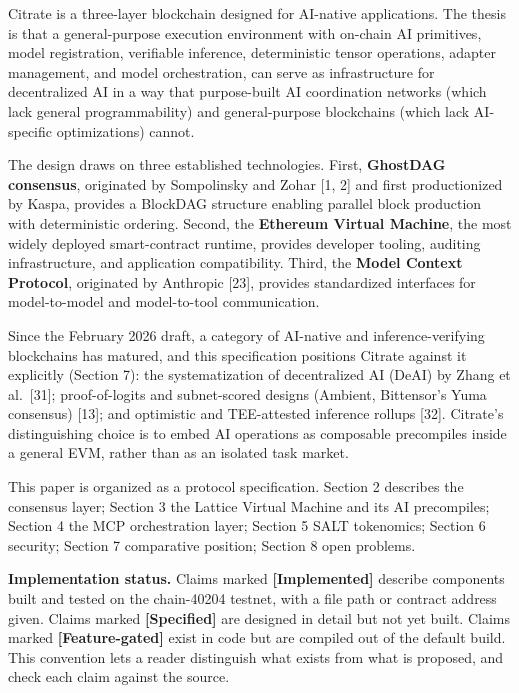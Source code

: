 Citrate is a three-layer blockchain designed for AI-native applications.
The thesis is that a general-purpose execution environment with on-chain
AI primitives, model registration, verifiable inference, deterministic
tensor operations, adapter management, and model orchestration, can
serve as infrastructure for decentralized AI in a way that purpose-built
AI coordination networks (which lack general programmability) and
general-purpose blockchains (which lack AI-specific optimizations)
cannot.

The design draws on three established technologies. First,
\textbf{GhostDAG consensus}, originated by Sompolinsky and Zohar {[}1,
2{]} and first productionized by Kaspa, provides a BlockDAG structure
enabling parallel block production with deterministic ordering. Second,
the \textbf{Ethereum Virtual Machine}, the most widely deployed
smart-contract runtime, provides developer tooling, auditing
infrastructure, and application compatibility. Third, the \textbf{Model
Context Protocol}, originated by Anthropic {[}23{]}, provides
standardized interfaces for model-to-model and model-to-tool
communication.

Since the February 2026 draft, a category of AI-native and
inference-verifying blockchains has matured, and this specification
positions Citrate against it explicitly (Section 7): the systematization
of decentralized AI (DeAI) by Zhang et al.~{[}31{]}; proof-of-logits and
subnet-scored designs (Ambient, Bittensor's Yuma consensus) {[}13{]};
and optimistic and TEE-attested inference rollups {[}32{]}. Citrate's
distinguishing choice is to embed AI operations as composable
precompiles inside a general EVM, rather than as an isolated task
market.

This paper is organized as a protocol specification. Section 2 describes
the consensus layer; Section 3 the Lattice Virtual Machine and its AI
precompiles; Section 4 the MCP orchestration layer; Section 5 SALT
tokenomics; Section 6 security; Section 7 comparative position; Section
8 open problems.

\textbf{Implementation status.} Claims marked \textbf{{[}Implemented{]}}
describe components built and tested on the chain-40204 testnet, with a
file path or contract address given. Claims marked
\textbf{{[}Specified{]}} are designed in detail but not yet built.
Claims marked \textbf{{[}Feature-gated{]}} exist in code but are
compiled out of the default build. This convention lets a reader
distinguish what exists from what is proposed, and check each claim
against the source.

